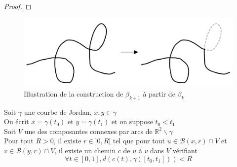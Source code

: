 \documentclass{article}
\begin{document}
\begin{flushleft}
\begin{proof}
\end{proof}

\begin{figure}[h]
    \caption{Illustration de la construction de $\beta_{k+1}$ à partir de $\beta_k$}
    \centering
    \includegraphics[width = 0.75 \textwidth]{Reduction de retours.png}
\end{figure}

\begin{tcolorbox}[colback = purple!20!white, colframe = purple!60!white, title = Proposition 7]
    Soit $\gamma$ une courbe de Jordan, $x, y \in \gamma$\\
    On écrit $x = \gamma(t_0)$ et $y = \gamma(t_1)$ et on suppose $t_0 < t_1$\\
    Soit $V$ une des composantes connexes par arcs de $\mathbb{R}^2 \backslash \gamma$\\
    Pour tout $R > 0$, il existe $r \in ]0, R[$ tel que pour tout
    $u \in \mathcal{B}(x, r) \cap V$ et $v \in \mathcal{B}(y, r) \cap V$,
    il existe un chemin $c$ de $u$ à $v$ dans $V$ vérifiant
    \[ \forall t \in [0, 1], d(c(t), \gamma([t_0, t_1])) < R \]
\end{tcolorbox}


\end{flushleft}
\end{document}
